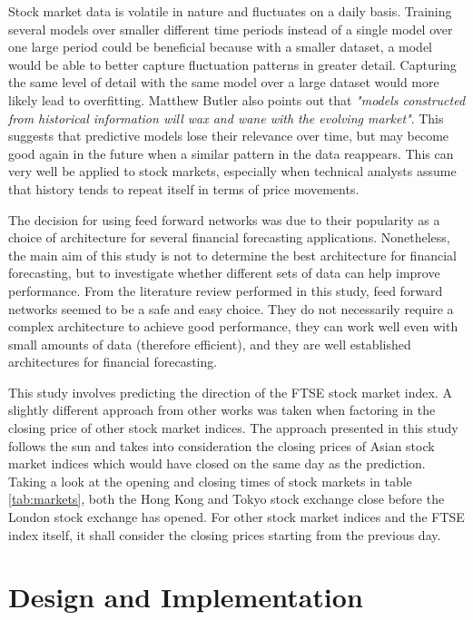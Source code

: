 \documentclass{UoYCSproject}
\begin{document}
Stock market data is volatile in nature and fluctuates on a daily basis. Training several models over smaller different time periods instead of a single model over one large period could be beneficial because with a smaller dataset, a model would be able to better capture fluctuation patterns in greater detail. Capturing the same level of detail with the same model over a large dataset would more likely lead to overfitting. Matthew Butler also points out that \textit{"models constructed from historical information will wax and wane with the evolving market"}\cite{butler2012computational}. This suggests that predictive models lose their relevance over time, but may become good again in the future when a similar pattern in the data reappears. This can very well be applied to stock markets, especially when technical analysts assume that history tends to repeat itself in terms of price movements.

The decision for using feed forward networks was due to their popularity as a choice of architecture for several financial forecasting applications. Nonetheless, the main aim of this study is not to determine the best architecture for financial forecasting, but to investigate whether different sets of data can help improve performance. From the literature review performed in this study, feed forward networks seemed to be a safe and easy choice. They do not necessarily require a complex architecture to achieve good performance, they can work well even with small amounts of data (therefore efficient), and they are well established architectures for financial forecasting.    

This study involves predicting the direction of the FTSE stock market index. A slightly different approach from other works was taken when factoring in the closing price of other stock market indices. The approach presented in this study follows the sun and takes into consideration the closing prices of Asian stock market indices which would have closed on the same day as the prediction. Taking a look at the opening and closing times of stock markets in table \ref{tab:markets}, both the Hong Kong and Tokyo stock exchange close before the London stock exchange has opened. For other stock market indices and the FTSE index itself, it shall consider the closing prices starting from the previous day.       

\chapter{Design and Implementation}
\label{cha:implementation}
\end{document}
